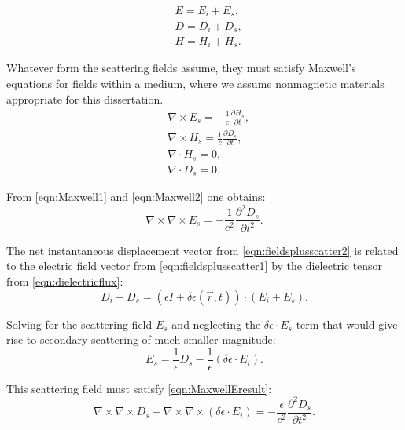 \begin{eqnarray}
	&E=E_i+E_s, \label{eqn:fieldsplusscatter1} \\ 
	&D=D_i+D_s, \label{eqn:fieldsplusscatter2} \\ 
	&H=H_i+H_s. \label{eqn:fieldsplusscatter3}
\end{eqnarray}

Whatever form the scattering fields assume, they must satisfy Maxwell’s equations for fields within a medium, where we assume nonmagnetic materials appropriate for this dissertation.
\begin{eqnarray}
	&\nabla \times E_s=-\frac{1}{c}\frac{\partial H_s}{\partial t}, \label{eqn:Maxwell1}\\
	&\nabla \times H_s=\frac{1}{c}\frac{\partial D_s}{\partial t}, \label{eqn:Maxwell2}\\
	&\nabla \cdot  H_s=0, \label{eqn:Maxwell3}\\
	&\nabla \cdot  D_s=0. \label{eqn:Maxwell4}
\end{eqnarray}

From \eqn\nolinebreak \ref{eqn:Maxwell1} and \eqn\nolinebreak \ref{eqn:Maxwell2} one obtains:
\begin{equation}
	\nabla \times \nabla \times E_s=-\frac{1}{c^2}\frac{\partial^2 D_s}{\partial t^2}.
	\label{eqn:MaxwellEresult}
\end{equation}

The net instantaneous displacement vector from \eqn\nolinebreak \ref{eqn:fieldsplusscatter2} is related to the electric field vector from \eqn \ref{eqn:fieldsplusscatter1} by the dielectric tensor from \eqn\nolinebreak \ref{eqn:dielectricflux}:
\begin{equation}
	D_i+D_s=\left(\epsilon I + \delta\epsilon\left(\vec{r},t\right)\right)\cdot \left(E_i+E_s \right ).
\end{equation}

Solving for the scattering field $E_s$ and neglecting the $\delta\epsilon\cdot E_s$ term that would give rise to secondary scattering of much smaller magnitude:
\begin{equation}
	E_s=\frac{1}{\epsilon}D_s-\frac{1}{\epsilon}\left(\delta \epsilon\cdot E_i\right).
\end{equation}

This scattering field must satisfy \eqn\nolinebreak \ref{eqn:MaxwellEresult}:
\begin{equation}
	\nabla \times \nabla \times D_s-\nabla \times \nabla \times \left(\delta \epsilon\cdot E_i\right)=-\frac{\epsilon}{c^2}\frac{\partial^2 D_s}{\partial t^2}.
\end{equation}

